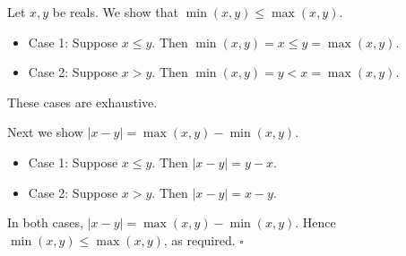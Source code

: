 Let $x, y$ be reals.
We show that $\min(x, y) \leq \max(x, y)$.

\begin{itemize}
  \item Case 1: Suppose $x \leq y$.
    Then $\min(x, y) = x \leq y = \max(x, y)$.
  \item Case 2: Suppose $x > y$.
    Then $\min(x, y) = y < x = \max(x, y)$.
\end{itemize}

These cases are exhaustive.

Next we show $\lvert x - y \rvert = \max(x, y) - \min(x, y)$.

\begin{itemize}
  \item Case 1: Suppose $x \leq y$.
    Then $\lvert x - y \rvert = y - x$.
  \item Case 2: Suppose $x > y$.
    Then $\lvert x - y \rvert = x - y$.
\end{itemize}

In both cases, $\lvert x - y \rvert = \max(x, y) - \min(x, y)$.
Hence $\min(x, y) \leq \max(x, y)$, as required. \hfill$\square$